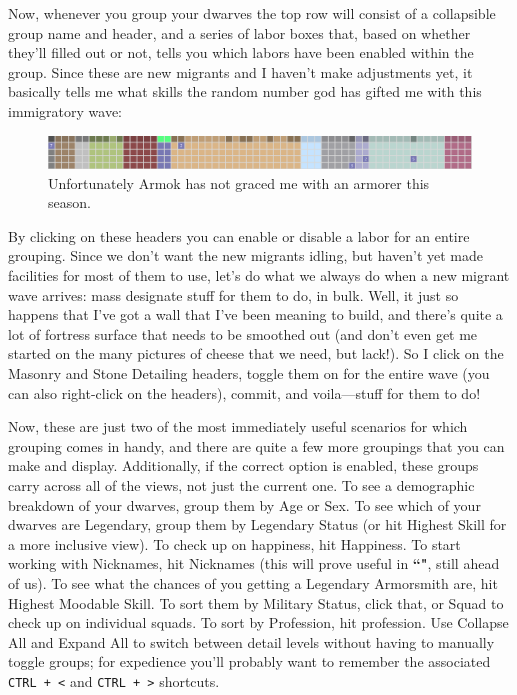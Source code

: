 \documentclass[]{article}
\begin{document}
Now, whenever you group your dwarves the top row will consist of a collapsible group name and header, and
a series of labor boxes that, based on whether they'll filled out or not, tells you which labors have
been enabled within the group. Since these are new migrants and I haven't make adjustments yet, it
basically tells me what skills the random number god has gifted me with this immigratory wave:

\begin{figure}[h!]
\centering
\includegraphics[width=\linewidth]{Sec2Fig9}
\caption{Unfortunately Armok has not graced me with an armorer this season.}
\end{figure}

By clicking on these headers you can enable or disable a labor for an entire grouping. Since we don't
want the new migrants idling, but haven't yet made facilities for most of them to use, let's do what we
always do when a new migrant wave arrives: mass designate stuff for them to do, in bulk. Well, it just so
happens that I've got a wall that I've been meaning to build, and there's quite a lot of fortress surface
that needs to be smoothed out (and don't even get me started on the many pictures of cheese that we need,
but lack!). So I click on the Masonry and Stone Detailing headers, toggle them on for the entire wave
(you can also right-click on the headers), commit, and voila---stuff for them to do!

Now, these are just two of the most immediately useful scenarios for which grouping comes in handy, and
there are quite a few more groupings that you can make and display. Additionally, if the correct option
is enabled, these groups carry across all of the views, not just the current one. To see a
demographic breakdown of your dwarves, group them by Age or Sex. To see which of your dwarves are
Legendary, group them by Legendary Status (or hit Highest Skill for a more inclusive view). To check up
on happiness, hit Happiness. To start working with Nicknames, hit Nicknames (this will prove useful in
\textbf{``"}, still ahead of us). To see what the chances of you
getting a Legendary Armorsmith are, hit Highest Moodable Skill. To sort them by Military Status, click
that, or Squad to check up on individual squads. To sort by Profession, hit profession.
Use Collapse All and Expand All to switch between detail levels without having to manually toggle groups;
for expedience you'll probably want to remember the associated \texttt{CTRL + <} and \texttt{CTRL + >}
shortcuts.
\end{document}
